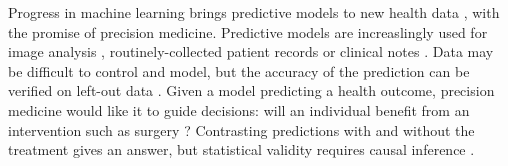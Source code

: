 \documentclass[10pt,twocolumn]{article}
\begin{document}
Progress in machine learning brings predictive models to new health data
\cite{beam2018big,rajkomar2019machine}, with the promise of precision medicine.
Predictive models are increaslingly used for image analysis
\cite{khojaste2022deep,zhang2019radiological,yala2019deep,shen2019deep,nassif2022breast},
routinely-collected patient records
\cite{mooney2018bigdata,desai2020comparison,simon2018predicting} or clinical
notes \cite{horng2017creating,wang2020prediction,spasic2020clinical}. Data may
be difficult to control and model, but the accuracy of the prediction can be
verified on left-out data
\cite{altman2009prognosis,poldrack2020establishment,varoquaux2022evaluating}.
Given a model predicting a health outcome, precision medicine would like it to
guide decisions: will an individual benefit from an intervention such as surgery
\cite{fontana2019can}? Contrasting predictions with and without the treatment
gives an answer, but statistical validity requires causal inference
\cite{snowden_implementation_2011,sperrin2019explicit,blakely2020reflection}.


\end{document}

